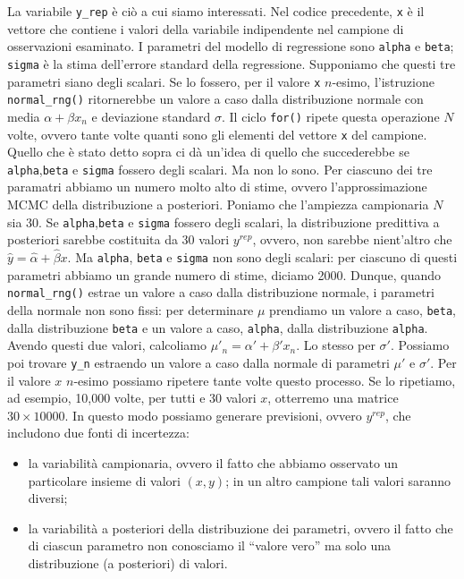 \documentclass[
  10pt,
  italian,
  a4paper,
  extrafontsizes,onecolumn,openright
  ]{memoir}
\providecommand{\tightlist}{%
  \setlength{\itemsep}{0pt}\setlength{\parskip}{0pt}}
\begin{document}
\noindent
La variabile \texttt{y\_rep} è ciò a cui siamo interessati. Nel codice precedente, \texttt{x} è il vettore che contiene i valori della variabile indipendente nel campione di osservazioni esaminato. I parametri del modello di regressione sono \texttt{alpha} e \texttt{beta}; \texttt{sigma} è la stima dell'errore standard della regressione. Supponiamo che questi tre parametri siano degli scalari. Se lo fossero, per il valore \texttt{x} \(n\)-esimo, l'istruzione \texttt{normal\_rng()} ritornerebbe un valore a caso dalla distribuzione normale con media \(\alpha + \beta x_n\) e deviazione standard \(\sigma\). Il ciclo \texttt{for()} ripete questa operazione \(N\) volte, ovvero tante volte quanti sono gli elementi del vettore \texttt{x} del campione. Quello che è stato detto sopra ci dà un'idea di quello che succederebbe se \texttt{alpha},\texttt{beta} e \texttt{sigma} fossero degli scalari. Ma non lo sono. Per ciascuno dei tre paramatri abbiamo un numero molto alto di stime, ovvero l'approssimazione MCMC della distribuzione a posteriori. Poniamo che l'ampiezza campionaria \(N\) sia 30. Se \texttt{alpha},\texttt{beta} e \texttt{sigma} fossero degli scalari, la distribuzione predittiva a posteriori sarebbe costituita da 30 valori \(y^{rep}\), ovvero, non sarebbe nient'altro che \(\hat{y} = \hat{\alpha} + \hat{\beta} x\). Ma \texttt{alpha}, \texttt{beta} e \texttt{sigma} non sono degli scalari: per ciascuno di questi parametri abbiamo un grande numero di stime, diciamo 2000. Dunque, quando \texttt{normal\_rng()} estrae un valore a caso dalla distribuzione normale, i parametri della normale non sono fissi: per determinare \(\mu\) prendiamo un valore a caso, \texttt{beta\textquotesingle{}}, dalla distribuzione \texttt{beta} e un valore a caso, \texttt{alpha\textquotesingle{}}, dalla distribuzione \texttt{alpha}. Avendo questi due valori, calcoliamo \(\mu'_n = \alpha' + \beta' x_n\). Lo stesso per \(\sigma'\). Possiamo poi trovare \texttt{y\_n\textquotesingle{}} estraendo un valore a caso dalla normale di parametri \(\mu'\) e \(\sigma'\). Per il valore \(x\) \(n\)-esimo possiamo ripetere tante volte questo processo. Se lo ripetiamo, ad esempio, 10,000 volte, per tutti e 30 valori \(x\), otterremo una matrice \(30 \times 10000\). In questo modo possiamo generare previsioni, ovvero \(y^{rep}\), che includono due fonti di incertezza:

\begin{itemize}
\tightlist
\item
  la variabilità campionaria, ovvero il fatto che abbiamo osservato un particolare insieme di valori \((x, y)\); in un altro campione tali valori saranno diversi;
\item
  la variabilità a posteriori della distribuzione dei parametri, ovvero il fatto che di ciascun parametro non conosciamo il ``valore vero'' ma solo una distribuzione (a posteriori) di valori.
\end{itemize}
\end{document}
